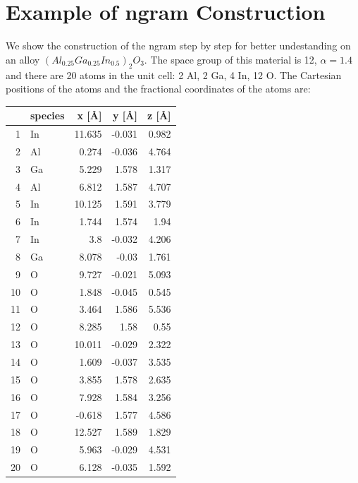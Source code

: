 \documentclass[11pt,oneside,czech,american]{book} %
\theoremstyle{plain}
\theoremstyle{definition}
\begin{document}
\chapter{Example of ngram Construction}
We show the construction of the ngram step by step for better undestanding on an alloy $(Al_{0.25}Ga_{0.25}In_{0.5})_2 O_3$. The space group of this material is 12, $\alpha=1.4$ and there are 20 atoms in the unit cell: 2 Al, 2 Ga, 4 In, 12 O. The Cartesian positions of the atoms and the fractional coordinates of the atoms are:
\begin{table}[h]
	\centering
	\begin{tabular}{rlrrr}
		\hline
		& species   &   x [\AA] &   y [\AA] &   z [\AA] \\
		\hline
		1 & In        &  11.635 &  -0.031 &   0.982 \\
		2 & Al        &   0.274 &  -0.036 &   4.764 \\
		3 & Ga        &   5.229 &   1.578 &   1.317 \\
		4 & Al        &   6.812 &   1.587 &   4.707 \\
		5 & In        &  10.125 &   1.591 &   3.779 \\
		6 & In        &   1.744 &   1.574 &   1.94  \\
		7 & In        &   3.8   &  -0.032 &   4.206 \\
		8 & Ga        &   8.078 &  -0.03  &   1.761 \\
		9 & O         &   9.727 &  -0.021 &   5.093 \\
		10 & O         &   1.848 &  -0.045 &   0.545 \\
		11 & O         &   3.464 &   1.586 &   5.536 \\
		12 & O         &   8.285 &   1.58  &   0.55  \\
		13 & O         &  10.011 &  -0.029 &   2.322 \\
		14 & O         &   1.609 &  -0.037 &   3.535 \\
		15 & O         &   3.855 &   1.578 &   2.635 \\
		16 & O         &   7.928 &   1.584 &   3.256 \\
		17 & O         &  -0.618 &   1.577 &   4.586 \\
		18 & O         &  12.527 &   1.589 &   1.829 \\
		19 & O         &   5.963 &  -0.029 &   4.531 \\
		20 & O         &   6.128 &  -0.035 &   1.592 \\
		\hline
	\end{tabular}

\end{table}
\end{document}
